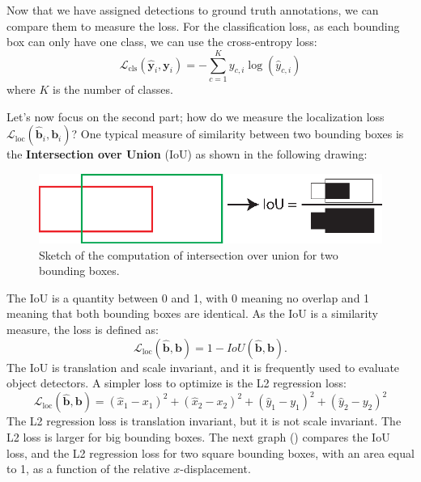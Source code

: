 Now that we have assigned detections to ground truth annotations, we can compare them to measure the loss. For the classification loss, as each bounding box can only have one class, we can use the cross-entropy loss: 
\begin{equation}
    \mathcal{L}_{\text{cls}}(\hat{\mathbf{y}}_i, \mathbf{y}_i)
     = -  \sum_{c=1}^{K} y_{c,i} \log(\hat{y}_{c,i}) 
\end{equation}
where $K$ is the number of classes.  

Let's now focus on the second part; how do we measure the localization loss $\mathcal{L}_{\text{loc}} (\hat{\mathbf{b}}_i, \mathbf{b}_i)$? One typical measure of similarity between two bounding boxes is the {\bf Intersection over Union}
(IoU) as shown in the following drawing:

\begin{figure}
\centerline{
\includegraphics[width=0.55\linewidth]{figures/object_recognition/iou.eps}
}
\caption{Sketch of the computation of intersection over union for two bounding boxes.}
\end{figure}

The IoU is a quantity between 0 and 1, with 0 meaning no overlap and 1 meaning that both bounding boxes are identical. As the IoU is a similarity measure, the loss is defined as:
\begin{equation}
\mathcal{L}_{\text{loc}} (\hat{\mathbf{b}}, \mathbf{b})= 1-IoU (\hat{\mathbf{b}}, \mathbf{b}).
\end{equation}
The IoU is translation and scale invariant, and it is frequently used to evaluate object detectors. A simpler loss to optimize is the L2 regression loss:
\begin{equation}
\mathcal{L}_{\text{loc}} (\hat{\mathbf{b}}, \mathbf{b}) = (\hat{x}_1 - x_1)^2 + (\hat{x}_2 - x_2)^2 + (\hat{y}_1 - y_1)^2 + (\hat{y}_2 - y_2)^2
\end{equation}
The L2 regression loss is translation invariant, but it is not scale invariant. The L2 loss is larger for big bounding boxes. The next graph (\fig{\ref{fig:iou_l2_comparison}}) compares the IoU loss, and the L2 regression loss for two square bounding boxes, with an area equal to 1, as a function of the relative $x$-displacement.

